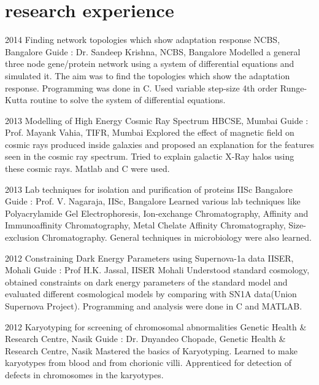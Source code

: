 \documentclass[11pt]{friggeri-cv}
\begin{document}
\section{research experience}
\begin{entrylist}
  \entry
    {2014}
    {Finding network topologies which show adaptation response}
    {NCBS, Bangalore}
    {Guide : Dr. Sandeep Krishna, NCBS, Bangalore}
    {Modelled a general three node gene/protein network using a system of differential equations and simulated it. The aim was to find the topologies which show the adaptation response. Programming was done in C. Used variable step-size 4th order Runge-Kutta routine to solve the system of differential equations.}
\end{entrylist}
\begin{entrylist}

  \entry
    {2013}
    {Modelling of High Energy Cosmic Ray Spectrum}
    {HBCSE, Mumbai}
    {Guide : Prof. Mayank Vahia, TIFR, Mumbai}
    {Explored the effect of magnetic field on cosmic rays produced inside galaxies and proposed an explanation for the features seen in the cosmic ray spectrum. Tried to explain galactic X-Ray halos using these cosmic rays. Matlab and C were used.
    }
\end{entrylist}
\begin{entrylist}
    
  \entry
    {2013}
    {Lab techniques for isolation and purification of proteins}
    {IISc Bangalore}
    {
    Guide : Prof. V. Nagaraja, IISc, Bangalore}
    {Learned various lab techniques like Polyacrylamide Gel Electrophoresis, Ion-exchange Chromatography, Affinity and Immunoaffinity Chromatography, Metal Chelate Affinity Chromatography,  Size-exclusion Chromatography. General techniques in microbiology were also learned.
    }    
\end{entrylist}
\begin{entrylist}

  \entry
    {2012}
    {Constraining Dark Energy Parameters using Supernova-1a data}
    {IISER, Mohali}
    {Guide : Prof H.K. Jassal, IISER Mohali}
    {Understood standard cosmology,  obtained constraints on dark energy parameters of the standard model and evaluated different cosmological models by comparing with SN1A data(Union Supernova Project). Programming and analysis were done in C and MATLAB.
    }
    
\end{entrylist}
\begin{entrylist}


  \entry
    {2012}
    {Karyotyping for screening of chromosomal abnormalities}
    {Genetic Health \& Research Centre, Nasik}
    {
    Guide : Dr. Dnyandeo Chopade, Genetic Health \& Research Centre, Nasik}
    {
    Mastered the basics of Karyotyping. Learned to make karyotypes from blood and from chorionic villi.  Apprenticed for  detection of defects in chromosomes in the karyotypes.
    }
    \end{entrylist}
\end{document}
